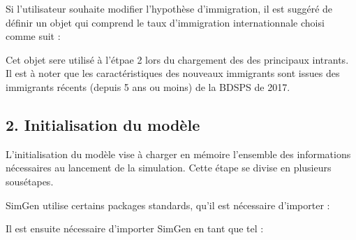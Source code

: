 \documentclass[letterpaper,10pt,french]{sphinxmanual}
\begin{document}
Si l’utilisateur souhaite modifier l’hypothèse d’immigration, il est suggéré de définir un objet qui comprend le taux d’immigration internationnale choisi comme suit :

\begin{sphinxVerbatim}[commandchars=\\\{\}]
  
\end{sphinxVerbatim}

Cet objet sere utilisé à l’étpae 2 lors du chargement des des principaux intrants.
Il est à noter que les caractéristiques des nouveaux immigrants sont issues des immigrants récents (depuis 5 ans ou moins) de la BDSPS de 2017.


\subsection{2. Initialisation du modèle}
\label{\detokenize{utilisation:initialisation-du-modele}}
L’initialisation du modèle vise à charger en mémoire l’ensemble des informations nécessaires au lancement de la simulation.
Cette étape se divise en plusieurs sous\sphinxhyphen{}étapes.


SimGen utilise certains packages standards, qu’il est nécessaire d’importer :

\begin{sphinxVerbatim}[commandchars=\\\{\}]
 
   
   
     
\end{sphinxVerbatim}


Il est ensuite nécessaire d’importer SimGen en tant que tel :

\begin{sphinxVerbatim}[commandchars=\\\{\}]
 
    
\end{sphinxVerbatim}
\end{document}

